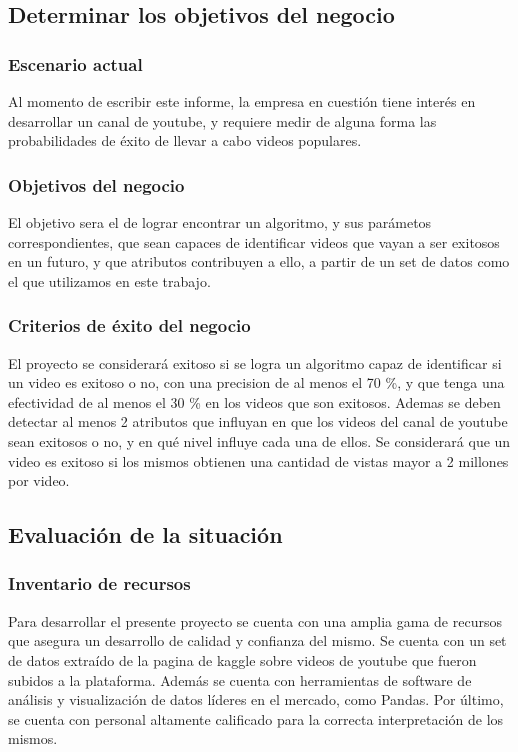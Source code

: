 \subsection{Determinar los objetivos del negocio}
    \subsubsection{Escenario actual}
    Al momento de escribir este informe, la empresa en cuestión tiene interés
    en desarrollar un canal de youtube, y requiere medir de alguna forma las
    probabilidades de éxito de llevar a cabo videos populares.
    \subsubsection{Objetivos del negocio}
    El objetivo sera el de lograr encontrar un algoritmo, y sus parámetos
    correspondientes, que sean capaces de identificar videos que vayan a ser
    exitosos en un futuro, y que atributos contribuyen a ello, a partir de un
    set de datos como el que utilizamos en este trabajo.
    \subsubsection{Criterios de éxito del negocio}
    El proyecto se considerará exitoso si se logra un algoritmo capaz de
    identificar si un video es exitoso o no, con una precision de al menos el
    70 \%, y que tenga una efectividad de al menos el 30 \% en los videos que
    son exitosos. Ademas se deben detectar al menos 2 atributos que influyan
    en que los videos del canal de youtube sean exitosos o no, y en qué nivel
    influye cada una de ellos. Se considerará que un video es exitoso si los
    mismos obtienen una cantidad de vistas mayor a 2 millones por video.

\subsection{Evaluación de la situación}

    \subsubsection{Inventario de recursos}

    Para desarrollar el presente proyecto se cuenta con una amplia gama de recursos que
    asegura un desarrollo de calidad y confianza del mismo.
    Se cuenta con un set de datos extraído de la pagina de kaggle sobre videos
    de youtube que fueron subidos a la plataforma. Además se cuenta con
    herramientas de software de análisis y visualización de datos líderes
    en el mercado, como Pandas. Por último, se cuenta con personal
    altamente calificado para la correcta interpretación de los mismos.

